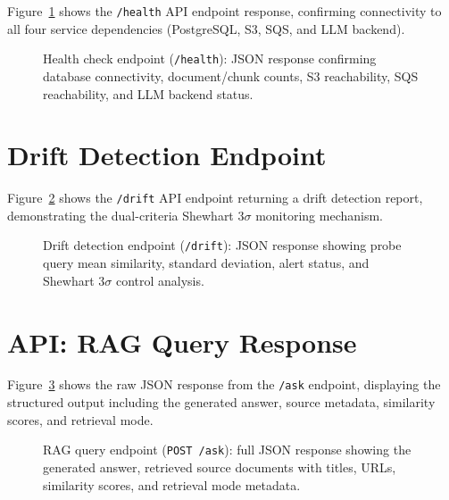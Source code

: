 \documentclass[12pt,a4paper]{report}
\begin{document}
Figure~\ref{fig:demo_health} shows the \texttt{/health} API endpoint response, confirming connectivity to all four service dependencies (PostgreSQL, S3, SQS, and LLM backend).

\begin{figure}[H]
\centering
{}
\caption{Health check endpoint (\texttt{/health}): JSON response confirming database connectivity, document/chunk counts, S3 reachability, SQS reachability, and LLM backend status.}
\label{fig:demo_health}
\end{figure}

\section*{Drift Detection Endpoint}

Figure~\ref{fig:demo_drift} shows the \texttt{/drift} API endpoint returning a drift detection report, demonstrating the dual-criteria Shewhart $3\sigma$ monitoring mechanism.

\begin{figure}[H]
\centering
{}
\caption{Drift detection endpoint (\texttt{/drift}): JSON response showing probe query mean similarity, standard deviation, alert status, and Shewhart $3\sigma$ control analysis.}
\label{fig:demo_drift}
\end{figure}

\section*{API: RAG Query Response}

Figure~\ref{fig:demo_api} shows the raw JSON response from the \texttt{/ask} endpoint, displaying the structured output including the generated answer, source metadata, similarity scores, and retrieval mode.

\begin{figure}[H]
\centering
{}
\caption{RAG query endpoint (\texttt{POST /ask}): full JSON response showing the generated answer, retrieved source documents with titles, URLs, similarity scores, and retrieval mode metadata.}
\label{fig:demo_api}
\end{figure}
\end{document}
